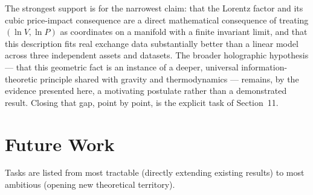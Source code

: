 \documentclass[12pt,a4paper]{article}
\begin{document}
The strongest support is for the narrowest claim: that the Lorentz factor
and its cubic price-impact consequence are a direct mathematical
consequence of treating $(\ln V,\ln P)$ as coordinates on a manifold with
a finite invariant limit, and that this description fits real exchange
data substantially better than a linear model across three independent
assets and datasets. The broader holographic hypothesis --- that this
geometric fact is an instance of a deeper, universal information-theoretic
principle shared with gravity and thermodynamics --- remains, by the
evidence presented here, a motivating postulate rather than a demonstrated
result. Closing that gap, point by point, is the explicit task of
Section~11.


\section{Future Work}

Tasks are listed from most tractable (directly extending existing results)
to most ambitious (opening new theoretical territory).
\end{document}
